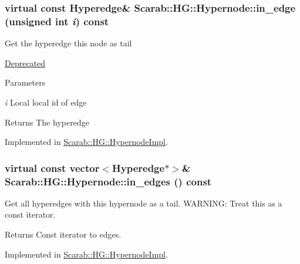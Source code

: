 \hypertarget{class_scarab_1_1_h_g_1_1_hypernode_a533d3e0bc2269ec07edbda32305daf70}{
\subsubsection[{in\_\-edge}]{\setlength{\rightskip}{0pt plus 5cm}virtual const {\bf Hyperedge}\& Scarab::HG::Hypernode::in\_\-edge (unsigned int {\em i}) const}}
\label{class_scarab_1_1_h_g_1_1_hypernode_a533d3e0bc2269ec07edbda32305daf70}
Get the hyperedge this node as tail \begin{Desc}
\item[\hyperlink{deprecated__deprecated000010}{Deprecated}]\end{Desc}

\begin{DoxyParams}{Parameters}
\item[{\em i}]Local local id of edge\end{DoxyParams}
\begin{DoxyReturn}{Returns}
The hyperedge 
\end{DoxyReturn}


Implemented in \hyperlink{class_scarab_1_1_h_g_1_1_hypernode_impl_a26ff9db30c03c7b74181e9f901aa71d4}{Scarab::HG::HypernodeImpl}.

\hypertarget{class_scarab_1_1_h_g_1_1_hypernode_aad118748408663b8242dc52d45bbd49d}{
\subsubsection[{in\_\-edges}]{\setlength{\rightskip}{0pt plus 5cm}virtual const vector$<${\bf Hyperedge}$\ast$$>$\& Scarab::HG::Hypernode::in\_\-edges () const}}
\label{class_scarab_1_1_h_g_1_1_hypernode_aad118748408663b8242dc52d45bbd49d}
Get all hyperedges with this hypernode as a tail. WARNING: Treat this as a const iterator. \begin{DoxyReturn}{Returns}
Const iterator to edges. 
\end{DoxyReturn}


Implemented in \hyperlink{class_scarab_1_1_h_g_1_1_hypernode_impl_a77fe0de2e3927be6145cb8fc018088c9}{Scarab::HG::HypernodeImpl}.

